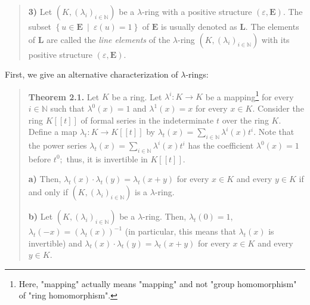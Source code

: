 \documentclass[12pt,final,notitlepage,onecolumn,german]{article}%
\begin{document}
\begin{quote}
\textbf{3)} Let $\left(  K,\left(  \lambda_{i}\right)  _{i\in\mathbb{N}%
}\right)  $ be a $\lambda$-ring with a positive structure $\left(
\varepsilon,\mathbf{E}\right)  .$ The subset $\left\{  u\in\mathbf{E}%
\ \mid\ \varepsilon\left(  u\right)  =1\right\}  $ of $\mathbf{E}$ is usually
denoted as $\mathbf{L}$. The elements of $\mathbf{L}$ are called the
\textit{line elements} of the $\lambda$-ring $\left(  K,\left(  \lambda
_{i}\right)  _{i\in\mathbb{N}}\right)  $ with its positive structure $\left(
\varepsilon,\mathbf{E}\right)  $.
\end{quote}

First, we give an alternative characterization of $\lambda$-rings:

\begin{quote}
\textbf{Theorem 2.1.} Let $K$ be a ring. Let $\lambda^{i}:K\rightarrow K$ be a
mapping\footnote{Here, "mapping" actually means "mapping" and not "group
homomorphism" of "ring homomorphism".} for every $i\in\mathbb{N}$ such that
$\lambda^{0}\left(  x\right)  =1$ and $\lambda^{1}\left(  x\right)  =x$ for
every $x\in K$. Consider the ring $K\left[  \left[  t\right]  \right]  $ of
formal series in the indeterminate $t$ over the ring $K.$ Define a map
$\lambda_{t}:K\rightarrow K\left[  \left[  t\right]  \right]  $ by
$\lambda_{t}\left(  x\right)  =\sum\limits_{i\in\mathbb{N}}\lambda^{i}\left(
x\right)  t^{i}$. Note that the power series $\lambda_{t}\left(  x\right)
=\sum\limits_{i\in\mathbb{N}}\lambda^{i}\left(  x\right)  t^{i}$ has the
coefficient $\lambda^{0}\left(  x\right)  =1$ before $t^{0};$ thus, it is
invertible in $K\left[  \left[  t\right]  \right]  $.

\textbf{a)} Then, $\lambda_{t}\left(  x\right)  \cdot\lambda_{t}\left(
y\right)  =\lambda_{t}\left(  x+y\right)  $ for every $x\in K$ and every $y\in
K$ if and only if $\left(  K,\left(  \lambda_{i}\right)  _{i\in\mathbb{N}%
}\right)  $ is a $\lambda$-ring.

\textbf{b)} Let $\left(  K,\left(  \lambda_{i}\right)  _{i\in\mathbb{N}%
}\right)  $ be a $\lambda$-ring. Then, $\lambda_{t}\left(  0\right)  =1$,
$\lambda_{t}\left(  -x\right)  =\left(  \lambda_{t}\left(  x\right)  \right)
^{-1}$ (in particular, this means that $\lambda_{t}\left(  x\right)  $ is
invertible) and $\lambda_{t}\left(  x\right)  \cdot\lambda_{t}\left(
y\right)  =\lambda_{t}\left(  x+y\right)  $ for every $x\in K$ and every $y\in
K$.
\end{quote}
\end{document}
